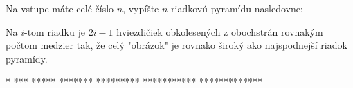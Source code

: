 




Na vstupe máte celé číslo $n$, vypíšte $n$ riadkovú pyramídu nasledovne:

Na $i$-tom riadku je $2i-1$ hviezdičiek obkolesených z obochstrán rovnakým počtom medzier tak,
že celý "obrázok" je rovnako široký ako najspodnejší riadok pyramídy.

\vystup
      *      
     ***     
    *****    
   *******   
  *********  
 *********** 
*************
\koniec


